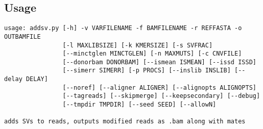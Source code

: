\documentclass[letterpaper,11pt]{article}
\begin{document}
\subsection{Usage}
\begin{verbatim}
usage: addsv.py [-h] -v VARFILENAME -f BAMFILENAME -r REFFASTA -o OUTBAMFILE
                [-l MAXLIBSIZE] [-k KMERSIZE] [-s SVFRAC]
                [--minctglen MINCTGLEN] [-n MAXMUTS] [-c CNVFILE]
                [--donorbam DONORBAM] [--ismean ISMEAN] [--issd ISSD]
                [--simerr SIMERR] [-p PROCS] [--inslib INSLIB] [--delay DELAY]
                [--noref] [--aligner ALIGNER] [--alignopts ALIGNOPTS]
                [--tagreads] [--skipmerge] [--keepsecondary] [--debug]
                [--tmpdir TMPDIR] [--seed SEED] [--allowN]

adds SVs to reads, outputs modified reads as .bam along with mates


\end{verbatim}
\end{document}
